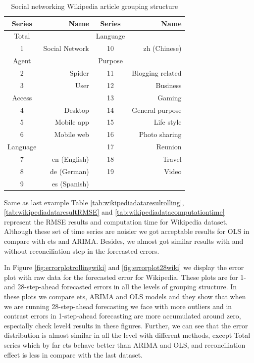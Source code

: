 \documentclass[11pt,a4paper,]{article}
\begin{document}
\begin{table}[t]

\caption{\label{tab:wikipediagroupingstructure}Social networking Wikipedia article grouping structure}
\centering
\begin{tabular}{crcr}
\toprule
Series & Name & Series & Name\\
\midrule
Total &  & Language & \\
1 & Social Network & 10 & zh (Chinese)\\
Agent &  & Purpose & \\
2 & Spider & 11 & Blogging related\\
3 & User & 12 & Business\\
Access &  & 13 & Gaming\\
4 & Desktop & 14 & General purpose\\
5 & Mobile app & 15 & Life style\\
6 & Mobile web & 16 & Photo sharing\\
Language &  & 17 & Reunion\\
7 & en (English) & 18 & Travel\\
8 & de (German) & 19 & Video\\
9 & es (Spanish) &  & \\
\bottomrule
\end{tabular}
\end{table}

Same as last example Table \ref{tab:wikipediadataresulrolling},
\ref{tab:wikipediadataresultRMSE} and
\ref{tab:wikipediadatacomputationtime} represent the RMSE results and
computation time for Wikipedia dataset. Although these set of time
series are noisier we got acceptable results for OLS in compare with ets
and ARIMA. Besides, we almost got similar results with and without
reconciliation step in the forecasted errors.

In Figure \ref{fig:errorplotrollingwiki} and \ref{fig:errorplot28wiki}
we display the error plot with raw data for the forecasted error for
Wikipedia. These plots are for 1- and 28-step-ahead forecasted errors in
all the levels of grouping structure. In these plots we compare ets,
ARIMA and OLS models and they show that when we are running
28-step-ahead forecasting we face with more outliers and in contrast
errors in 1-step-ahead forecasting are more accumulated around zero,
especially check level4 results in these figures. Further, we can see
that the error distribution is almost similar in all the level with
different methods, except Total series which by far ets behave better
than ARIMA and OLS, and reconciliation effect is less in compare with
the last dataset.
\end{document}
